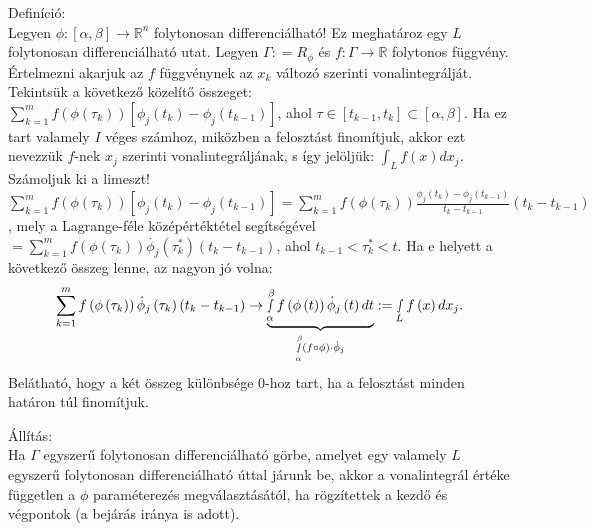 \documentclass[12pt,a4paper]{scrartcl}
\newenvironment{definicio}{}{}
\newenvironment{allitas}{}{}
\begin{document}
\begin{definicio}

Definíció:\\
Legyen
\(\left. \phi:\left\lbrack {\alpha,\beta} \right\rbrack\rightarrow{\mathbb{R}}^{n} \right.\)
folytonosan differenciálható! Ez meghatároz egy \(L\) folytonosan
differenciálható utat. Legyen \(\Gamma: = R_{\phi}\) és
\(\left. f:\Gamma\rightarrow{\mathbb{R}} \right.\) folytonos függvény.
Értelmezni akarjuk az \(f\) függvénynek az \(x_{k}\) változó szerinti
vonalintegrálját. Tekintsük a következő közelítő összeget:
\(\sum\limits_{k = 1}^{m}{f\left( {\phi\left( \tau_{k} \right)} \right)\left\lbrack {\phi_{j}\left( t_{k} \right) - \phi_{j}\left( t_{k - 1} \right)} \right\rbrack}\),
ahol
\(\tau \in \left\lbrack {t_{k - 1},t_{k}} \right\rbrack \subset \left\lbrack {\alpha,\beta} \right\rbrack\).
Ha ez tart valamely \(I\) véges számhoz, miközben a felosztást
finomítjuk, akkor ezt nevezzük \(f\)-nek \(x_{j}\) szerinti
vonalintegráljának, s így jelöljük:
\(\int_{L}{f\left( x \right)dx_{j}}\). Számoljuk ki a limeszt!
\({\sum\limits_{k = 1}^{m}{f\left( {\phi\left( \tau_{k} \right)} \right)\left\lbrack {\phi_{j}\left( t_{k} \right) - \phi_{j}\left( t_{k - 1} \right)} \right\rbrack}} = {\sum\limits_{k = 1}^{m}{f\left( {\phi\left( \tau_{k} \right)} \right)\frac{\phi_{j}\left( t_{k} \right) - \phi_{j}\left( t_{k - 1} \right)}{t_{k} - t_{k - 1}}\left( {t_{k} - t_{k - 1}} \right)}}\),
mely a Lagrange-féle középértéktétel segítségével
\(= {\sum\limits_{k = 1}^{m}{f\left( {\phi\left( \tau_{k} \right)} \right){\overset{.}{\phi}}_{j}\left( \tau_{k}^{\ast} \right)}}\left( {t_{k} - t_{k - 1}} \right)\),
ahol \(t_{k - 1} < \tau_{k}^{\ast} < t\). Ha e helyett a következő
összeg lenne, az nagyon jó volna:
\[\mathop \sum \limits_{k = 1}^m f\left( {\phi \left( {{\tau _k}} \right)} \right){\dot \phi _j}\left( {{\tau _k}} \right)\left( {{t_k} - {t_{k - 1}}} \right) \to \underbrace {\mathop \smallint \limits_\alpha ^\beta  f\left( {\phi \left( t \right)} \right){{\dot \phi }_j}\left( t \right)dt}_{\mathop \smallint \limits_\alpha ^\beta  \left( {f \circ \phi } \right) \cdot {{\dot \phi }_j}}: = \mathop \smallint \limits_L f\left( x \right)d{x_j}.\]Belátható,
hogy a két összeg különbsége 0-hoz tart, ha a felosztást minden határon
túl finomítjuk.

\end{definicio}

\begin{allitas}

Állítás:\\
Ha \(\Gamma\) egyszerű folytonosan differenciálható görbe, amelyet egy
valamely \(L\) egyszerű folytonosan differenciálható úttal járunk be,
akkor a vonalintegrál értéke független a \(\phi\) paraméterezés
megválasztásától, ha rögzítettek a kezdő és végpontok (a bejárás iránya
is adott).

\end{allitas}
\end{document}
